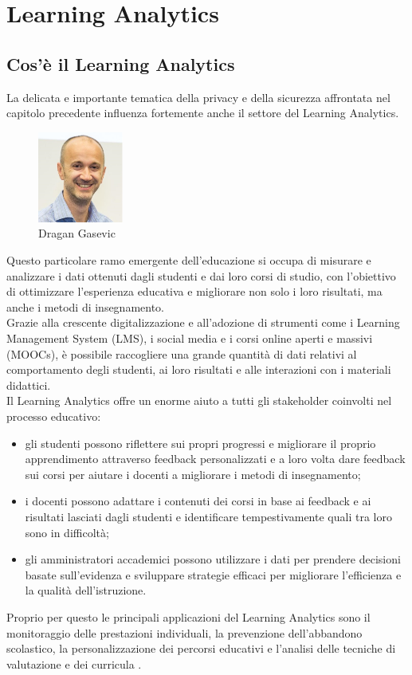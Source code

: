 \chapter{Learning Analytics}
\section{Cos'è il Learning Analytics}
La delicata e importante tematica della privacy e della sicurezza affrontata nel capitolo precedente influenza fortemente anche il settore
del Learning Analytics.
\begin{figure}
    \centering
    \includegraphics[width=0.25\textwidth]{Immagini/Dragan Gasevic.jpg}
    \caption{Dragan Gasevic}
\end{figure}
Questo particolare ramo emergente dell'educazione si occupa di misurare e analizzare i dati ottenuti dagli studenti e dai loro corsi
di studio, con l'obiettivo di ottimizzare l'esperienza educativa e migliorare non solo i loro risultati, ma anche i metodi di insegnamento. 
\\Grazie alla crescente digitalizzazione e all'adozione di strumenti 
come i Learning Management System (LMS), i social media e i corsi online aperti e massivi (MOOCs), è possibile raccogliere una grande quantità di dati relativi al comportamento degli studenti, 
ai loro risultati e alle interazioni con i materiali didattici. 
\\Il Learning Analytics offre un enorme aiuto a tutti gli stakeholder coinvolti nel processo educativo:
\begin{itemize}
    \item gli studenti possono riflettere sui propri progressi e migliorare il proprio apprendimento attraverso feedback personalizzati e a loro volta dare feedback sui corsi per aiutare i docenti a migliorare i metodi di insegnamento;
    \item i docenti possono adattare i contenuti dei corsi in base ai feedback e ai risultati lasciati dagli studenti e identificare tempestivamente quali tra loro sono in difficoltà;
    \item gli amministratori accademici possono utilizzare i dati per prendere decisioni basate sull'evidenza e sviluppare strategie efficaci per migliorare l'efficienza e la qualità dell'istruzione.
\end{itemize}
Proprio per questo le principali applicazioni del Learning Analytics sono il monitoraggio delle prestazioni individuali, la prevenzione dell'abbandono scolastico,
la personalizzazione dei percorsi educativi e l'analisi delle tecniche di valutazione e dei curricula \cite{wikipedia_learning_analytics}.


